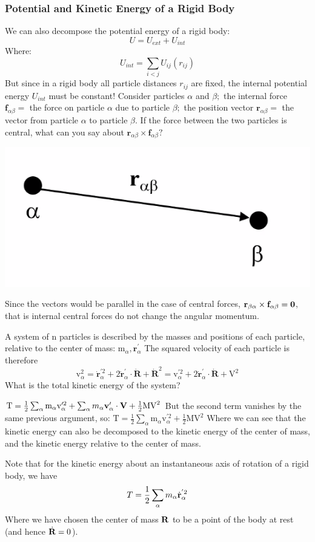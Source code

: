 \documentclass[../PHYS306Notes.tex]{subfiles}
\begin{document}
\subsubsection{Potential and Kinetic Energy of a Rigid Body}
We can also decompose the potential energy of a rigid body:
\[U = U_{ext} + U_{int}\]
Where:
\[U_{int} = \sum_{i < j} U_{ij}(r_{ij})\]
But since in a rigid body all particle distances $r_{ij}$ are fixed, the internal potential energy $U_{int}$ must be constant!
\newline Consider particles $\alpha$ and $\beta ;$ the internal force $\mathbf{f}_{\alpha \beta}=$ the force on particle $\alpha$ due to particle $\beta ;$ the position vector $\mathbf{r}_{\alpha \beta}=$ the vector from particle $\alpha$ to particle $\beta .$ If the force between the two particles is central, what can you say about $\mathbf{r}_{\alpha \beta} \times \mathbf{f}_{\alpha \beta} ?$
\begin{center}
    \includegraphics[scale=0.5]{Lecture-17/l17-img3.png}
\end{center}
\begin{s}
Since the vectors would be parallel in the case of central forces, $\mathbf{r}_{\beta\alpha} \times \mathbf{f}_{\alpha\beta} = \mathbf{0}$, that is internal central forces do not change the angular momentum.
\end{s}
A system of n particles is described by the masses and positions of each particle, relative to the center of mass: $\mathrm{m}_{\alpha}, \mathbf{r}_{\alpha}^{\prime}$ The squared velocity of each particle is therefore
$$
\mathrm{v}_{\alpha}^{2}=\dot{\mathbf{r}}_{\alpha}^{\prime 2}+2 \dot{\mathbf{r}}_{\alpha}^{\prime} \cdot \dot{\mathbf{R}}+\dot{\mathbf{R}}^{2}=\mathrm{v}_{\alpha}^{\prime 2}+2 \dot{\mathbf{r}}_{\alpha}^{\prime} \cdot \dot{\mathbf{R}}+\mathrm{V}^{2}
$$
What is the total kinetic energy of the system?
\begin{s}
$\mathrm{T}=\frac{1}{2} \sum_{\alpha} \mathrm{m}_{\alpha} \mathrm{v}_{\alpha}^{\prime 2}+ \sum_\alpha m_\alpha \mathbf{v}_\alpha' \cdot \mathbf{V} + \frac{1}{2} \mathrm{MV}^{2} $ But the second term vanishes by the same previous argument, so:
$\mathrm{T}=\frac{1}{2} \sum_{\alpha} \mathrm{m}_{\alpha} \mathrm{v}_{\alpha}^{\prime 2}+\frac{1}{2} \mathrm{MV}^{2}$ Where we can see that the kinetic energy can also be decomposed to the kinetic energy of the center of mass, and the kinetic energy relative to the center of mass. 
\end{s}
Note that for the kinetic energy about an instantaneous axis of rotation of a rigid body, we have
\[T = \frac{1}{2}\sum_\alpha m_\alpha \dot{\mathbf{r}}^{'2}_\alpha\]
Where we have chosen the center of mass $\mathbf{R}$ to be a point of the body at rest (and hence $\dot{\mathbf{R}} = 0$). 
\end{document}
